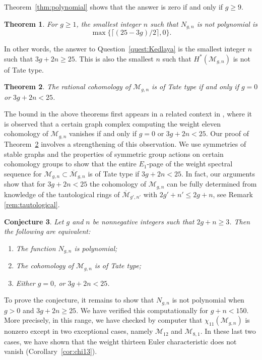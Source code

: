 \documentclass[12pt]{amsart}
\newtheorem{thm}{Theorem}[section]
\newtheorem{conj}[thm]{Conjecture}
\theoremstyle{definition}
\numberwithin{equation}{section}
\newcommand{\M}{\mathcal{M}}
\newcommand{\ocM}{\overline{\mathcal{M}}}
\newcommand{\cM}{\mathcal{M}}
\newcommand{\MM}{\overline{\mathcal{M}}}
\theoremstyle{definition} %
\theoremstyle{remark}
\begin{document}
Theorem~\ref{thm:polynomial} shows that the answer is zero if and only if $g \geq 9$. 

\begin{thm} \label{thm:smallestn}
For $g \geq 1$, the smallest integer $n$ such that $N_{g,n}$ is not polynomial is $$\max\{\lceil (25-3g)/2 \rceil, 0 \}.$$
\end{thm}

\noindent In other words, the answer to Question~\ref{quest:Kedlaya} is the smallest  integer $n$ such that $3g + 2n \geq 25$. This is also the smallest $n$ such that $H^*(\M_{g,n})$ is not of Tate type.

\begin{thm}\label{thm:Tatetype-markedpoints}
    The rational cohomology of $\M_{g,n}$ is of Tate type if and only if $g = 0$ or $3g + 2n < 25$.
\end{thm}

\noindent The bound in the above theorems first appears in a related context in \cite[Section~4]{PayneWillwacher24}, where it is observed that a certain graph complex computing the weight eleven cohomology of $\cM_{g,n}$ vanishes if and only if $g = 0$ or $3g + 2n < 25$. Our proof of Theorem~\ref{thm:Tatetype-markedpoints} involves a strengthening of this observation. We use symmetries of stable graphs and the properties of symmetric group actions on certain cohomology groups to show that the entire $E_1$-page of the weight spectral sequence for $\cM_{g,n} \subset \ocM_{g,n}$ is of Tate type if $3g + 2n < 25$. In fact, our arguments show that for $3g + 2n < 25$ the cohomology of $\M_{g,n}$ can be fully determined from knowledge of the tautological rings of $\MM_{g',n'}$ with $2g'+n' \leq 2g + n$, see Remark  \ref{rem:tautological}.

\begin{conj}\label{conj:polynomial}
Let $g$ and $n$ be nonnegative integers such that $2g + n \geq 3$.  Then the following are equivalent:
\begin{enumerate}
\item The function $N_{g,n}$ is polynomial;
\item The cohomology of $\M_{g,n}$ is of Tate type;
\item Either $g=0$, or $3g+2n<25$.
\end{enumerate}
\end{conj}

To prove the conjecture, it remains to show that $N_{g,n}$ is not polynomial when $g > 0$ and $3g + 2n \geq 25$. We have verified this computationally for $g + n < 150$. More precisely, in this range, we have checked by computer that $\chi_{11}(\M_{g,n})$ is nonzero except in two exceptional cases, namely $\cM_{12}$ and $\cM_{8,1}$. In these last two cases, we have shown that the weight thirteen Euler characteristic does not vanish (Corollary~\ref{cor:chi13}).
\end{document}
